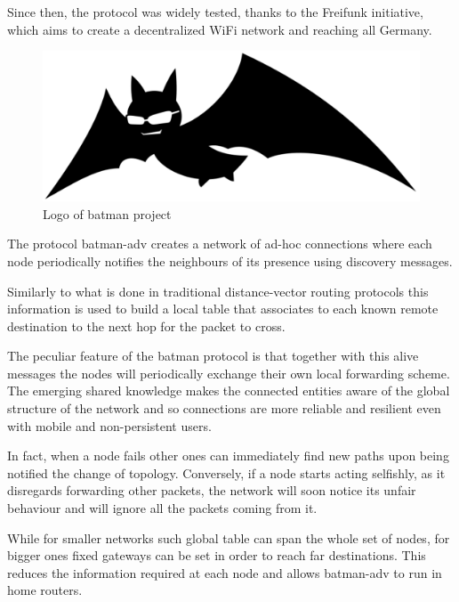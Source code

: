 \documentclass[conference]{IEEEtran}
\begin{document}
Since then, the protocol was widely tested, thanks to the Freifunk initiative, which aims to create a decentralized WiFi network and reaching all Germany.

\begin{figure}[h]
  \centering
  \includegraphics[width=0.8\linewidth]{figures/logo.pdf}
  \caption{Logo of \gls{batman} project}
  \label{fig:batman_logo}
\end{figure}

\smallskip


The protocol \gls{batman}-adv creates a network of ad-hoc connections where each node periodically notifies the neighbours of its presence using discovery messages.

Similarly to what is done in traditional distance-vector routing protocols this information is used to build a local table that associates to each known remote destination to the next hop for the packet to cross.

The peculiar feature of the \gls{batman} protocol is that together with this alive messages the nodes will periodically exchange their own local forwarding scheme. The emerging shared knowledge makes the connected entities aware of the global structure of the network and so connections are more reliable and resilient even with mobile and non-persistent users.

In fact, when a node fails other ones can immediately find new paths upon being notified the change of topology.
Conversely, if a node starts acting selfishly, as it disregards forwarding other packets, the network will soon notice its unfair behaviour and will ignore all the packets coming from it.

While for smaller networks such global table can span the whole set of nodes, for bigger ones fixed gateways can be set in order to reach far destinations. This reduces the information required at each node and allows \gls{batman}-adv to run in home routers.

\smallskip
\end{document}

